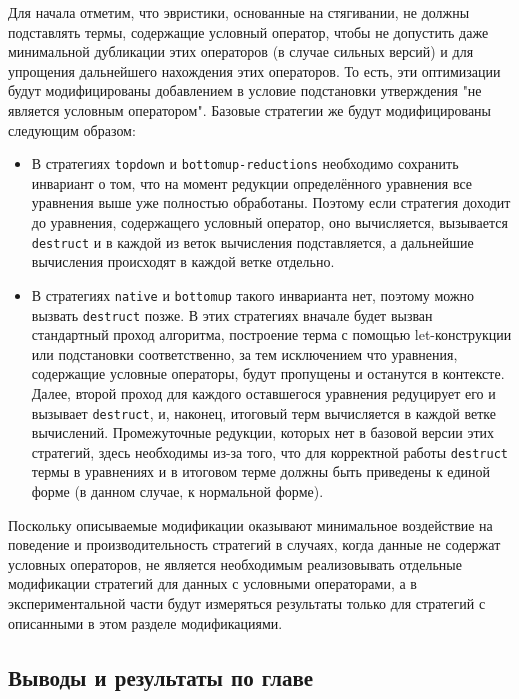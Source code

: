 \documentclass[../thesis.tex]{subfiles}
\begin{document}
Для начала отметим, что эвристики, основанные на стягивании, не должны подставлять термы, содержащие условный оператор, чтобы не допустить даже минимальной дубликации этих операторов (в случае сильных версий) и для упрощения дальнейшего нахождения этих операторов. То есть, эти оптимизации будут модифицированы добавлением в условие подстановки утверждения "не является условным оператором". Базовые стратегии же будут модифицированы следующим образом:

\begin{itemize}
  \item В стратегиях \texttt{topdown} и \texttt{bottomup-reductions} необходимо сохранить инвариант о том, что на момент редукции определённого уравнения все уравнения выше уже полностью обработаны. Поэтому если стратегия доходит до уравнения, содержащего условный оператор, оно вычисляется, вызывается \texttt{destruct} и в каждой из веток вычисления подставляется, а дальнейшие вычисления происходят в каждой ветке отдельно.
  \item В стратегиях \texttt{native} и \texttt{bottomup} такого инварианта нет, поэтому можно вызвать \texttt{destruct} позже. В этих стратегиях вначале будет вызван стандартный проход алгоритма, построение терма с помощью let-конструкции или подстановки соответственно, за тем исключением что уравнения, содержащие условные операторы, будут пропущены и останутся в контексте. Далее, второй проход для каждого оставшегося уравнения редуцирует его и вызывает \texttt{destruct}, и, наконец, итоговый терм вычисляется в каждой ветке вычислений. Промежуточные редукции, которых нет в базовой версии этих стратегий, здесь необходимы из-за того, что для корректной работы \texttt{destruct} термы в уравнениях и в итоговом терме должны быть приведены к единой форме (в данном случае, к нормальной форме).
\end{itemize}

Поскольку описываемые модификации оказывают минимальное воздействие на поведение и производительность стратегий в случаях, когда данные не содержат условных операторов, не является необходимым реализовывать отдельные модификации стратегий для данных с условными операторами, а в экспериментальной части будут измеряться результаты только для стратегий с описанными в этом разделе модификациями.

\subsection{Выводы и результаты по главе}
\end{document}
